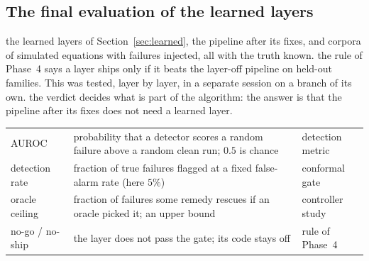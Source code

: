 \subsection{The final evaluation of the learned layers}\label{sec:final}
\sectionbrief
{the learned layers of Section~\ref{sec:learned}, the pipeline after its fixes, and corpora of simulated equations with failures injected, all with the truth known.}
{the rule of Phase~4 says a layer ships only if it beats the layer-off pipeline on held-out families. This was tested, layer by layer, in a separate session on a branch of its own.}
{the verdict decides what is part of the algorithm: the answer is that the pipeline after its fixes does not need a learned layer.}

\begin{symbols}
\begin{tabular}{@{}L{2.6cm}L{6.0cm}L{4.3cm}@{}}
AUROC & probability that a detector scores a random failure above a random clean run; $0.5$ is chance & detection metric\\
detection rate & fraction of true failures flagged at a fixed false-alarm rate (here $5\%$) & conformal gate\\
oracle ceiling & fraction of failures some remedy rescues if an oracle picked it; an upper bound & controller study\\
no-go / no-ship & the layer does not pass the gate; its code stays off & rule of Phase~4\\
\end{tabular}
\end{symbols}

